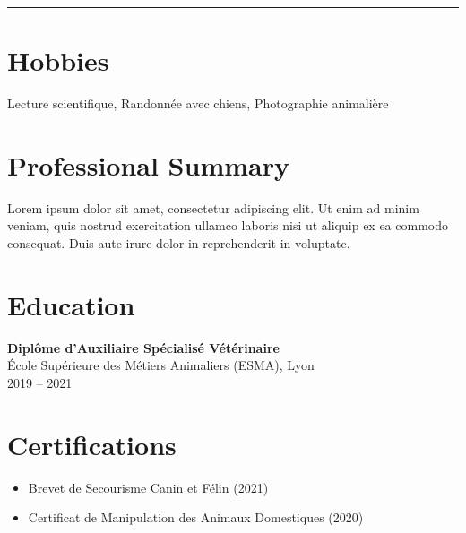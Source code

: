 \documentclass[10pt,letterpaper]{article}
\newcommand{\cvHr}{\vspace{0.5\baselineskip}\hrule height 1pt\color{primary}\vspace{0.7\baselineskip}}
\begin{document}
\begin{paracol}{2}
\begin{leftcolumn}
\cvHr

\section*{Hobbies}
Lecture scientifique, Randonnée avec chiens, Photographie animalière

\end{leftcolumn}

\begin{rightcolumn}

\section*{Professional Summary}
Lorem ipsum dolor sit amet, consectetur adipiscing elit. Ut enim ad minim veniam, quis nostrud exercitation ullamco laboris nisi ut aliquip ex ea commodo consequat. Duis aute irure dolor in reprehenderit in voluptate.

\section*{Education}
\begin{tcolorbox}[colback=white,boxrule=1pt,colframe=primary]
\textbf{Diplôme d’Auxiliaire Spécialisé Vétérinaire}\\
École Supérieure des Métiers Animaliers (ESMA), Lyon\\
2019 -- 2021
\end{tcolorbox}

\section*{Certifications}
\begin{itemize}
  \item Brevet de Secourisme Canin et Félin (2021)
  \item Certificat de Manipulation des Animaux Domestiques (2020)
\end{itemize}

\end{rightcolumn}

\end{paracol}
\end{document}
